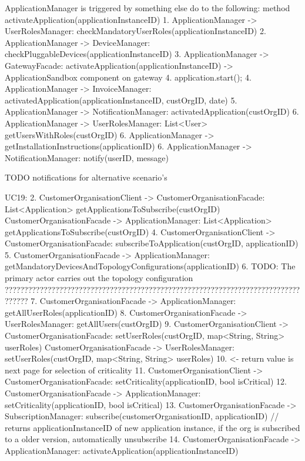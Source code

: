             ApplicationManager is triggered by something else do to the following: method activateApplication(applicationInstanceID)
            1. ApplicationManager -> UserRolesManager: checkMandatoryUserRoles(applicationInstanceID)
            2. ApplicationManager -> DeviceManager: checkPluggableDevices(applicationInstanceID)
            3. ApplicationManager -> GatewayFacade: activateApplication(applicationInstanceID) -> ApplicationSandbox component on gateway
            4. application.start();
            4. ApplicationManager -> InvoiceManager: activatedApplication(applicationInstanceID, custOrgID, date)
            5. ApplicationManager -> NotificationManager: activatedApplication(custOrgID)
            6. ApplicationManager -> UserRolesManager: List<User> getUsersWithRoles(custOrgID)
            6. ApplicationManager -> getInstallationInstructions(applicationID)
            6. ApplicationManager -> NotificationManager: notify(userID, message)

            TODO notifications for alternative scenario's

        UC19:
            2. CustomerOrganisationClient -> CustomerOrganisationFacade: List<Application> getApplicationsToSubscribe(custOrgID)
                   CustomerOrganisationFacade -> ApplicationManager: List<Application> getApplicationsToSubscribe(custOrgID)
            4. CustomerOrganisationClient -> CustomerOrganisationFacade: subscribeToApplication(custOrgID, applicationID)
            5. CustomerOrganisationFacade -> ApplicationManager: getMandatoryDevicesAndTopologyConfigurations(applicationID)
            6. TODO: The primary actor carries out the topology configuration ??????????????????????????????????????????????????????????????????????????????????
            7. CustomerOrganisationFacade -> ApplicationManager: getAllUserRoles(applicationID)
            8. CustomerOrganisationFacade -> UserRolesManager: getAllUsers(custOrgID)
            9. CustomerOrganisationClient -> CustomerOrganisationFacade: setUserRoles(custOrgID, map<String, String> userRoles)
                   CustomerOrganisationFacade -> UserRolesManager: setUserRoles(custOrgID, map<String, String> userRoles)
                   10. <- return value is next page for selection of criticality
            11. CustomerOrganisationClient -> CustomerOrganisationFacade: setCriticality(applicationID, bool isCritical)
                    12. CustomerOrganisationFacade -> ApplicationManager: setCriticality(applicationID, bool isCritical)
            13. CustomerOrganisationFacade -> SubscriptionManager: subscribe(customerOrganisationID, applicationID) // returns applicationInstanceID of new application instance, if the org is subscribed to a older version, automatically unsubscribe
            14. CustomerOrganisationFacade -> ApplicationManager: activateApplication(applicationInstanceID)


